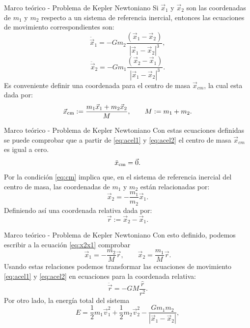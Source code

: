 \begin{frame}{Marco teórico - Problema de Kepler Newtoniano}
    Si $\vec{x}_1$ y $\vec{x}_2$ son las coordenadas de $m_1$ y $m_2$ respecto a un sistema de referencia
inercial, entonces las ecuaciones de movimiento correspondientes son:
\begin{equation}
\ddot{\vec{x}}_1=-Gm_2\frac{(\vec{x}_1-\vec{x}_2)}{|\vec{x}_1-\vec{x}_2|^3} ,\label{eq:acel1}
\end{equation}
\begin{equation}
\ddot{\vec{x}}_2=-Gm_1\frac{(\vec{x}_2-\vec{x}_1)}{|\vec{x}_1-\vec{x}_2|^3} .\label{eq:acel2}
\end{equation}
Es conveniente definir una coordenada para el centro de masa $\vec{x}_{cm}$, la cual esta dada por:
\begin{equation}
\vec{x}_{\rm cm}:=\frac{m_1\vec{x}_1+m_2\vec{x}_2}{M}, \qquad M:=m_1+m_2.
\end{equation}
\end{frame}
\begin{frame}{Marco teórico - Problema de Kepler Newtoniano}
    Con estas ecuaciones definidas se puede comprobar que a partir de \ref{eq:acel1} y \ref{eq:acel2}  el centro de masa $\vec{x}_{cm}$ es igual a cero.
    \begin{equation}
        \ddot{x}_{\rm cm} = \vec{0}.
        \label{eq:cm}
    \end{equation}
    Por la condición \ref{eq:cm} implica que, en el sistema de referencia inercial del centro de masa, las coordenadas
de $m_1$ y $m_2$ están relacionadas por:
\begin{equation}
    \vec{x}_2 = -\frac{m_1}{m_2} \vec{x}_1. \label{eq:x2x1}
\end{equation}
Definiendo así una coordenada relativa dada por:
\begin{equation}
    \vec{r}:= \vec{x}_2 - \vec{x}_1 \label{eq:r}.
\end{equation}
\end{frame}
\begin{frame}{Marco teórico - Problema de Kepler Newtoniano}
    Con esto definido, podemos escribir a la ecuación \ref{eq:x2x1} comprobar
\begin{equation}\label{eq:x12fr}
    \vec{x}_1=-\frac{m_2}{M}\vec{r}, \qquad \vec{x}_2=\frac{m_1}{M}\vec{r}.
\end{equation}
Usando estas relaciones podemos transformar las ecuaciones de movimiento \ref{eq:acel1} y \ref{eq:acel2} en ecuaciones para la coordenada relativa:
\begin{equation}
    \ddot{\vec{r}}=-GM \frac{\hat{r}}{r^2}.
    \label{eq:ddotr}
\end{equation}
Por otro lado, la energía total del sistema
\begin{equation}
    E=\frac{1}{2}m_1\vec{v}_1^2+\frac{1}{2}m_2\vec{v}_2^2-\frac{Gm_1m_2}{|\vec{x}_1-\vec{x}_2|},
\end{equation}
\end{frame}
